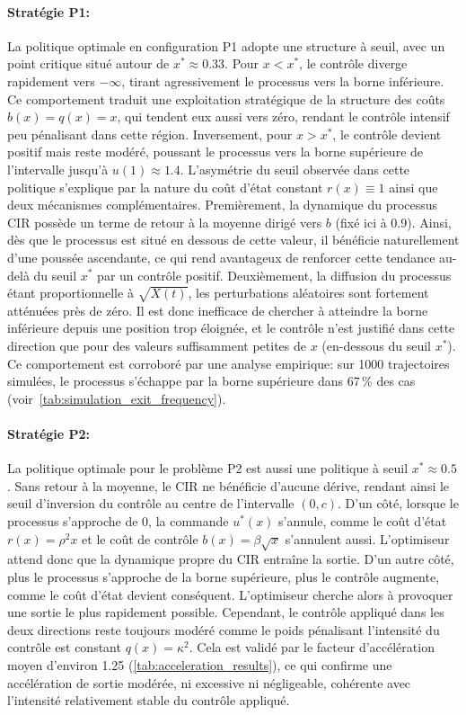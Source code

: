 \paragraph{Stratégie P1:} La politique optimale en configuration P1 adopte une structure à seuil, avec un point critique situé autour de \(x^* \approx 0.33\). Pour \(x < x^*\), le contrôle diverge rapidement vers \(-\infty\), tirant agressivement le processus vers la borne inférieure. Ce comportement traduit une exploitation stratégique de la structure des coûts \(b(x) = q(x) = x\), qui tendent eux aussi vers zéro, rendant le contrôle intensif peu pénalisant dans cette région. Inversement, pour \(x > x^*\), le contrôle devient positif mais reste modéré, poussant le processus vers la borne supérieure de l'intervalle jusqu'à \(u(1)\approx1.4\). L'asymétrie du seuil observée dans cette politique s'explique par la nature du coût d'état constant \(r(x)\equiv1\) ainsi que deux mécanismes complémentaires. Premièrement, la dynamique du processus \acs{CIR} possède un terme de retour à la moyenne dirigé vers \(b\) (fixé ici à 0.9). Ainsi, dès que le processus est situé en dessous de cette valeur, il bénéficie naturellement d'une poussée ascendante, ce qui rend avantageux de renforcer cette tendance au-delà du seuil \(x^*\) par un contrôle positif. Deuxièmement, la diffusion du processus étant proportionnelle à \(\sqrt{X(t)}\), les perturbations aléatoires sont fortement atténuées près de zéro. Il est donc inefficace de chercher à atteindre la borne inférieure depuis une position trop éloignée, et le contrôle n'est justifié dans cette direction que pour des valeurs suffisamment petites de \(x\) (en-dessous du seuil $x^*$). Ce comportement est corroboré par une analyse empirique: sur 1000 trajectoires simulées, le processus s'échappe par la borne supérieure dans 67\,\% des cas (voir~\ref{tab:simulation_exit_frequency}).
\paragraph{Stratégie P2:} La politique optimale pour le problème P2 est aussi une politique à seuil $x^*\approx0.5$. Sans retour à la moyenne, le \acs{CIR} ne bénéficie d'aucune dérive, rendant ainsi le seuil d'inversion du contrôle au centre de l'intervalle \((0,c)\). D'un côté, lorsque le processus s'approche de 0, la commande \(u^*(x)\) s'annule, comme le coût d'état \(r(x)=\rho^2x\) et le coût de contrôle \(b(x)=\beta\sqrt{x}\) s'annulent aussi. L'optimiseur attend donc que la dynamique propre du \acs{CIR} entraîne la sortie. D'un autre côté, plus le processus s'approche de la borne supérieure, plus le contrôle augmente, comme le coût d'état devient conséquent. L'optimiseur cherche alors à provoquer une sortie le plus rapidement possible. Cependant, le contrôle appliqué dans les deux directions reste toujours modéré comme le poids pénalisant l'intensité du contrôle est constant \(q(x)=\kappa^2\). Cela est validé par le facteur d'accélération moyen d'environ 1.25 (\ref{tab:acceleration_results}), ce qui confirme une accélération de sortie modérée, ni excessive ni négligeable, cohérente avec l'intensité relativement stable du contrôle appliqué.
